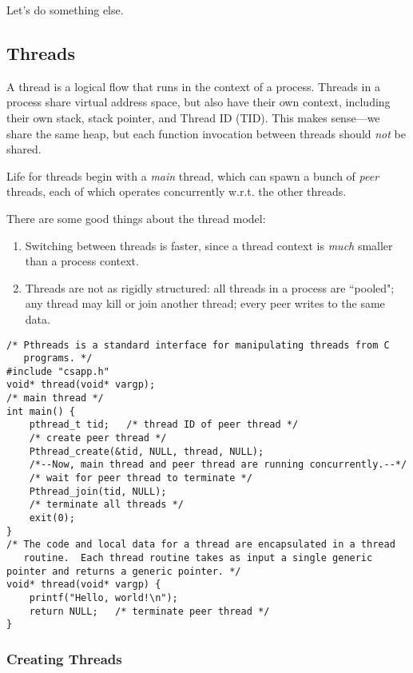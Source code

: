 \documentclass[fleqn]{article}
\begin{document}
Let's do something else.

\subsection{Threads}

A thread is a logical flow that runs in the context of a process. Threads in a process share virtual address space, but also have their own context, including their own stack, stack pointer, and Thread ID (TID). This makes sense---we share the same heap, but each function invocation between threads should \textit{not} be shared.

Life for threads begin with a \textit{main} thread, which can spawn a bunch of \textit{peer} threads, each of which operates concurrently w.r.t. the other threads.

There are some good things about the thread model:

\begin{enumerate}
\item Switching between threads is faster, since a thread context is \textit{much} smaller than a process context.

\item Threads are not as rigidly structured: all threads in a process are ``pooled"; any thread may kill or join another thread; every peer writes to the same data.
\end{enumerate}

\begin{verbatim}
/* Pthreads is a standard interface for manipulating threads from C  
   programs. */
#include "csapp.h"
void* thread(void* vargp);
/* main thread */
int main() {
    pthread_t tid;   /* thread ID of peer thread */
    /* create peer thread */
    Pthread_create(&tid, NULL, thread, NULL); 
    /*--Now, main thread and peer thread are running concurrently.--*/
    /* wait for peer thread to terminate */
    Pthread_join(tid, NULL);  
    /* terminate all threads */
    exit(0);  
}
/* The code and local data for a thread are encapsulated in a thread 
   routine.  Each thread routine takes as input a single generic 
pointer and returns a generic pointer. */
void* thread(void* vargp) {    
    printf("Hello, world!\n"); 
    return NULL;   /* terminate peer thread */
}
\end{verbatim}

\subsubsection{Creating Threads}
\end{document}
